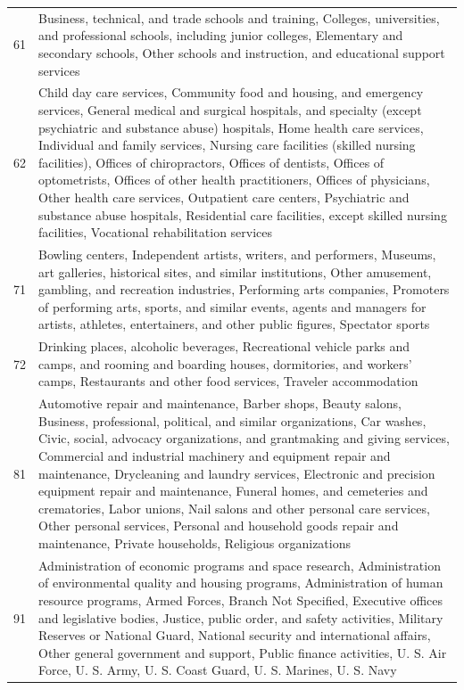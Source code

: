 \begin{longtable}{lp{18cm}}
  61 & Business, technical, and trade schools and training, Colleges, universities, and professional schools, including junior colleges, Elementary and secondary schools, Other schools and instruction, and educational support services \\ 
  62 & Child day care services, Community food and housing, and emergency services, General medical and surgical hospitals, and specialty (except psychiatric and substance abuse) hospitals, Home health care services, Individual and family services, Nursing care facilities (skilled nursing facilities), Offices of chiropractors, Offices of dentists, Offices of optometrists, Offices of other health practitioners, Offices of physicians, Other health care services, Outpatient care centers, Psychiatric and substance abuse hospitals, Residential care facilities, except skilled nursing facilities, Vocational rehabilitation services \\ 
  71 & Bowling centers, Independent artists, writers, and performers, Museums, art galleries, historical sites, and similar institutions, Other amusement, gambling, and recreation industries, Performing arts companies, Promoters of performing arts, sports, and similar events, agents and managers for artists, athletes, entertainers, and other public figures, Spectator sports \\ 
  72 & Drinking places, alcoholic beverages, Recreational vehicle parks and camps, and rooming and boarding houses, dormitories, and workers' camps, Restaurants and other food services, Traveler accommodation \\ 
  81 & Automotive repair and maintenance, Barber shops, Beauty salons, Business, professional, political, and similar organizations, Car washes, Civic, social, advocacy organizations, and grantmaking and giving services, Commercial and industrial machinery and equipment repair and maintenance, Drycleaning and laundry services, Electronic and precision equipment repair and maintenance, Funeral homes, and cemeteries and crematories, Labor unions, Nail salons and other personal care services, Other personal services, Personal and household goods repair and maintenance, Private households, Religious organizations \\ 
  91 & Administration of economic programs and space research, Administration of environmental quality and housing programs, Administration of human resource programs, Armed Forces, Branch Not Specified, Executive offices and legislative bodies, Justice, public order, and safety activities, Military Reserves or National Guard, National security and international affairs, Other general government and support, Public finance activities, U. S. Air Force, U. S. Army, U. S. Coast Guard, U. S. Marines, U. S. Navy \\
\end{longtable}

